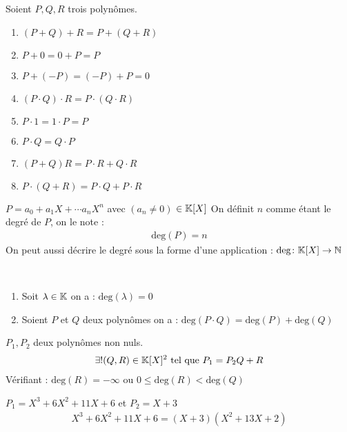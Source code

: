 \begin{graybox}
    \begin{proposition}
        Soient $P, Q, R$ trois polynômes.   
        \begin{enumerate}
            \item $(P + Q) + R = P + (Q + R)$
            \item $P + 0 = 0 + P = P$
            \item $P + (-P) = (-P) + P = 0$
            \item $(P \cdot Q) \cdot R = P \cdot (Q \cdot R)$
            \item $P \cdot 1 = 1 \cdot P = P$
            \item $P \cdot Q = Q \cdot P$ 
            \item $(P + Q) R = P \cdot R + Q \cdot R$
            \item $P \cdot (Q + R) = P \cdot Q + P \cdot R$
        \end{enumerate}
    \end{proposition}
\end{graybox}

\begin{graybox}
    \begin{definition}
        $P = a_0 + a_1 X + \cdots a_n X^n$ avec $(a_n \neq 0)$ $\in \mathbb{K}[X]$
        On définit $n$ comme étant le degré de $P$, on le note :
        \begin{align*}
            \mathrm{deg}(P) = n
        \end{align*}
        On peut aussi décrire le degré sous la forme d'une application :
        $\mathrm{deg} \colon \mathbb{K}[X] \to \mathbb{N}$
    \end{definition}
\end{graybox}

\begin{graybox}
    \begin{proposition}~ 
        \begin{enumerate}
            \item Soit $\lambda \in \mathbb{K}$ on a : $\mathrm{deg}(\lambda) = 0$
            \item Soient $P$ et $Q$ deux polynômes on a : $\mathrm{deg}(P \cdot Q) = \mathrm{deg}(P) + \mathrm{deg}(Q)$
        \end{enumerate}
    \end{proposition}
\end{graybox}

\begin{graybox}
    \begin{theoreme}
        $P_1, P_2$ deux polynômes non nuls.
        \begin{align*}
            \exists ! (Q, R) \in \mathbb{K}[X]^2 \text{ tel que } P_1 = P_2 Q + R 
        \end{align*}
        Vérifiant :
             $\mathrm{deg}(R) = -\infty$ ou $0 \leq \mathrm{deg}(R) < \mathrm{deg}(Q)$
    \end{theoreme}
\end{graybox}

\begin{exemple}
$P_1 = X^3 + 6X^2 + 11X + 6$ et $P_2 = X + 3$
\begin{align*}
X^3 + 6X^2 + 11X + 6 = (X+3)(X^2 + 13X + 2)  
\end{align*}
\end{exemple}
